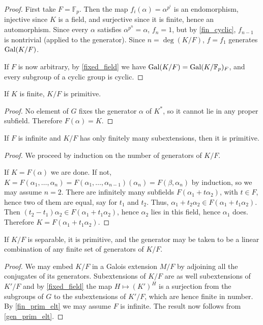 \begin{proof} First take $F = \mathbb{F}_p$.  Then the map $f_i(\alpha) =
\alpha^{p^i}$ is an endomorphism, injective since $K$ is a field, and
surjective since it is finite, hence an automorphism.  Since every $\alpha$
satisfies $\alpha^{p^n} = \alpha$, $f_n = 1$, but by \cref{fin_cyclic}, $f_{n -
1}$ is nontrivial (applied to the generator).  Since $n = \deg(K/F)$, $f =
f_1$ generates $\operatorname{\text{Gal}}(K/F)$.

If $F$ is now arbitrary, by \cref{fixed_field} we have $\operatorname{\text{Gal}}(K/F) =
\operatorname{\text{Gal}}(K/\mathbb{F}_p)_F$, and every subgroup of a cyclic group is cyclic.
\end{proof}

\begin{corollary} If $K$ is finite, $K/F$ is primitive.
\label{fin_prim_elt}
\end{corollary}

\begin{proof} No element of $G$ fixes the generator $\alpha$ of $K^\ast$, so
it cannot lie in any proper subfield.  Therefore $F(\alpha) = K$. \end{proof}

\begin{proposition} If $F$ is infinite and $K/F$ has only finitely many subextensions, then it is
primitive.
\label{gen_prim_elt}
\end{proposition}

\begin{proof} We proceed by induction on the number of generators of $K/F$.

If $K = F(\alpha)$ we are done.  If not, $K = F(\alpha_1, \dots, \alpha_n) =
F(\alpha_1, \dots, \alpha_{n - 1})(\alpha_n) = F(\beta, \alpha_n)$ by
induction, so we may assume $n = 2$.  There are infinitely many subfields
$F(\alpha_1 + t \alpha_2)$, with $t \in F$, hence two of them are equal, say for $t_1$ and
$t_2$.  Thus, $\alpha_1 + t_2 \alpha_2 \in F(\alpha_1 + t_1 \alpha_2)$.  Then
$(t_2 - t_1)\alpha_2 \in F(\alpha_1 + t_1 \alpha_2)$, hence $\alpha_2$ lies in
this field, hence $\alpha_1$ does.  Therefore $K = F(\alpha_1 + t_1
\alpha_2)$. \end{proof}

\begin{corollary} If $K/F$ is separable, it is primitive, and the generator may be
taken to be a linear combination of any finite set of generators of $K/F$.
\label{prim_elt}
\end{corollary}

\begin{proof} We may embed $K/F$ in a Galois extension $M/F$ by adjoining all
the conjugates of its generators.  Subextensions of $K/F$ are as well subextensions
of $K'/F$ and by \cref{fixed_field} the map $H \mapsto (K')^H$ is a surjection
from the subgroups of $G$ to the subextensions of $K'/F$, which are hence
finite in number.  By \cref{fin_prim_elt} we may assume $F$ is infinite.  The
result now follows from \cref{gen_prim_elt}. \end{proof}

